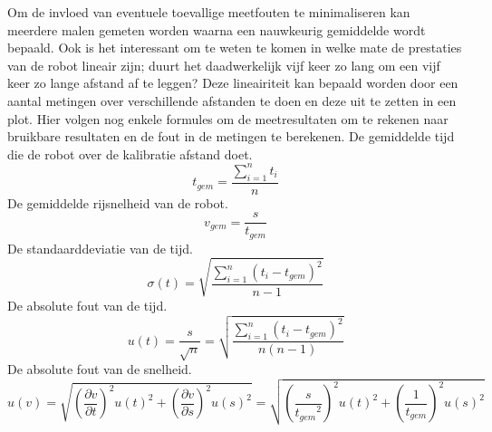 \documentclass{report}
\begin{document}
Om de invloed van eventuele toevallige meetfouten te minimaliseren kan meerdere malen gemeten worden waarna een nauwkeurig gemiddelde wordt bepaald. Ook is het interessant om te weten te komen in welke mate de prestaties van de robot lineair zijn; duurt het daadwerkelijk vijf keer zo lang om een vijf keer zo lange afstand af te leggen? Deze lineairiteit kan bepaald worden door een aantal metingen over verschillende afstanden te doen en deze uit te zetten in een plot.
Hier volgen nog enkele formules om de meetresultaten om te rekenen naar bruikbare resultaten en de fout in de metingen te berekenen.
\small{De gemiddelde tijd die de robot over de kalibratie afstand doet.}
\begin{equation}
\label{eq:avgTime}
t_{gem}=\frac{\sum_{i=1}^{n}t_i}{n}
\end{equation}
\small{De gemiddelde rijsnelheid van de robot.}
\begin{equation}
\label{eq:avgVel}
v_{gem} = \frac{s}{t_{gem}}
\end{equation}
\small{De standaarddeviatie van de tijd.}
\begin{equation}
\label{eq:standaardDev}
\sigma(t) = \sqrt{\frac{\sum_{i=1}^{n}( t_i-t_{gem})^2}{n-1}}
\end{equation}
\small{De absolute fout van de tijd.}
\begin{equation}
\label{eq:timeError}
u(t) = \frac{s}{\sqrt{n}} = \sqrt{\frac{\sum_{i=1}^{n}( t_i-t_{gem})^2}{n(n-1)}}
\end{equation}
\small{De absolute fout van de snelheid.}
\begin{equation}
\label{eq:velError}
u(v) = \sqrt{\left (\frac{\partial v }{\partial t }\right)^2 u(t)^2 + \left (\frac{\partial v }{\partial s }\right)^2 u(s)^2} = \sqrt{\left (\frac{s }{{t_{gem}}^2 }\right)^2 u(t)^2 + \left (\frac{1}{t_{gem} }\right)^2 u(s)^2}
\end{equation}
\end{document}
